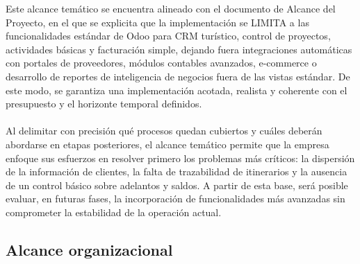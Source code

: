 \begin{indentedsubsection}
Este alcance temático se encuentra alineado con el documento de Alcance del Proyecto, en el que se explicita que la implementación se LIMITA a las funcionalidades estándar de Odoo para CRM turístico, control de proyectos, actividades básicas y facturación simple, dejando fuera integraciones automáticas con portales de proveedores, módulos contables avanzados, e-commerce o desarrollo de reportes de inteligencia de negocios fuera de las vistas estándar. De este modo, se garantiza una implementación acotada, realista y coherente con el presupuesto y el horizonte temporal definidos.
\\
\\
Al delimitar con precisión qué procesos quedan cubiertos y cuáles deberán abordarse en etapas posteriores, el alcance temático permite que la empresa enfoque sus esfuerzos en resolver primero los problemas más críticos: la dispersión de la información de clientes, la falta de trazabilidad de itinerarios y la ausencia de un control básico sobre adelantos y saldos. A partir de esta base, será posible evaluar, en futuras fases, la incorporación de funcionalidades más avanzadas sin comprometer la estabilidad de la operación actual.

\end{indentedsubsection}

\subsection{Alcance organizacional}

